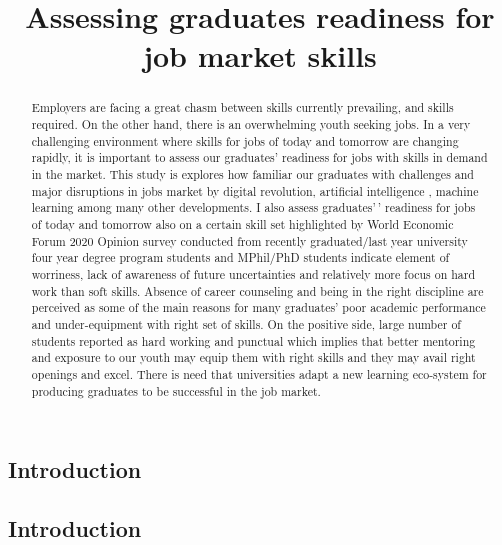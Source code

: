 \documentclass[
]{aft}
\title{Assessing graduates readiness for job market skills}
\author{}
\date{}
\begin{document}
\maketitle
\begin{abstract}
Employers are facing a great chasm between skills currently prevailing,
and skills required. On the other hand, there is an overwhelming youth
seeking jobs. In a very challenging environment where skills for jobs of
today and tomorrow are changing rapidly, it is important to assess our
graduates' readiness for jobs with skills in demand in the market. This
study is explores how familiar our graduates with challenges and major
disruptions in jobs market by digital revolution, artificial
intelligence , machine learning among many other developments. I also
assess graduates'\,' readiness for jobs of today and tomorrow also on a
certain skill set highlighted by World Economic Forum 2020 Opinion
survey conducted from recently graduated/last year university four year
degree program students and MPhil/PhD students indicate element of
worriness, lack of awareness of future uncertainties and relatively more
focus on hard work than soft skills. Absence of career counseling and
being in the right discipline are perceived as some of the main reasons
for many graduates' poor academic performance and under-equipment with
right set of skills. On the positive side, large number of students
reported as hard working and punctual which implies that better
mentoring and exposure to our youth may equip them with right skills and
they may avail right openings and excel. There is need that universities
adapt a new learning eco-system for producing graduates to be successful
in the job market.
\end{abstract}
\ifdefined\Shaded\renewenvironment{Shaded}{\begin{tcolorbox}[sharp corners, frame hidden, breakable, interior hidden, enhanced, boxrule=0pt, borderline west={3pt}{0pt}{shadecolor}]}{\end{tcolorbox}}\fi

\hypertarget{sec-intro}{%
\subsection{Introduction}\label{sec-intro}}

\hypertarget{introduction}{%
\subsection{Introduction}\label{introduction}}
\end{document}
